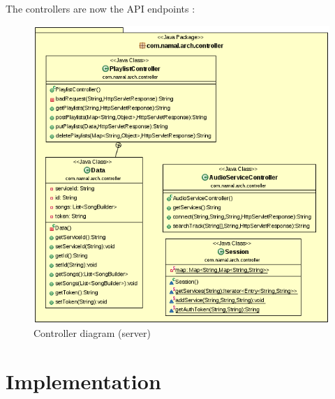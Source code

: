 \documentclass{report}
\begin{document}
{The controllers are now the API endpoints :

\begin{center}
\begin{figure}[H]

  \includegraphics[scale=0.4]{class/controllerServer.png}
  \caption{Controller diagram (server)}
  \label{controllerServer}
\end{figure}
\end{center}

}

\chapter{Implementation}
\end{document}
